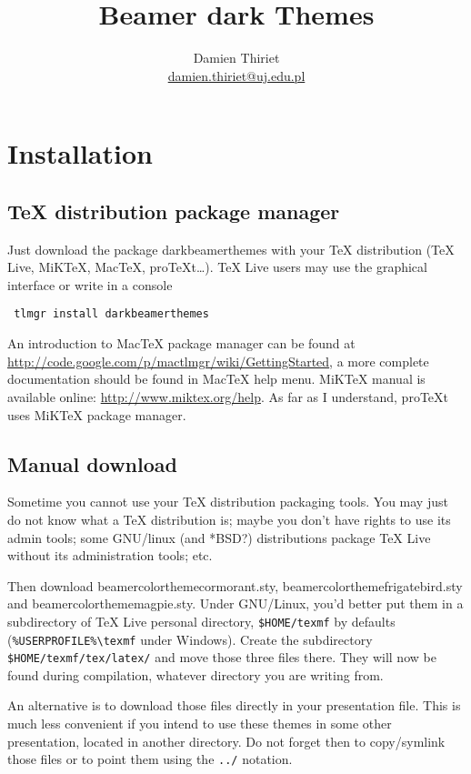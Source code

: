 \documentclass[12pt]{article}
\title{Beamer dark Themes}
\author{Damien Thiriet \\ \url{damien.thiriet@uj.edu.pl}}
\begin{document}
\maketitle
\tableofcontents

\section{Installation}

\subsection{TeX{} distribution package manager}

Just download the package \ttfamily darkbeamerthemes \rmfamily  with your \TeX{} distribution (\TeX{} Live, MiK\TeX{}, Mac\TeX{}, pro\TeX{}t…).
\TeX{} Live users may use the graphical interface or write in a console
\begin{verbatim}
 tlmgr install darkbeamerthemes
\end{verbatim}
An introduction to Mac\TeX{} package manager can be found at \url{http://code.google.com/p/mactlmgr/wiki/GettingStarted}, a more complete documentation should be found in Mac\TeX{} help menu.
MiK\TeX{} manual is available online: \url{http://www.miktex.org/help}.
As far as I understand, pro\TeX{}t uses MiK\TeX{} package manager.

\subsection{Manual download}

Sometime you cannot use your \TeX{} distribution packaging tools. You may just
do not know what a \TeX{} distribution is; maybe you don't have rights to use its admin tools; some GNU/linux (and *BSD?) distributions package \TeX{} Live without its administration tools; etc. 

Then download \ttfamily beamercolorthemecormorant.sty, beamercolorthemefrigatebird.sty and beamercolorthememagpie.sty. \rmfamily Under GNU/Linux, you'd better put them in a subdirectory of \TeX{} Live personal directory, \verb+$HOME/texmf+ by defaults (\verb+%USERPROFILE%\texmf+ under Windows). 
Create the subdirectory \verb+$HOME/texmf/tex/latex/+ and move those three files there. They will now be found during compilation, whatever directory you are writing from.

An alternative is to download those files directly in your presentation file. This is much less convenient if you intend to use these themes in some other presentation, located in another directory. Do not forget then to copy/symlink those files or to point them using the \verb+../+ notation.
\end{document}
